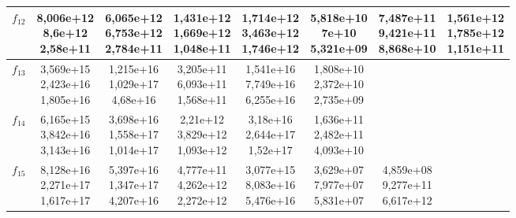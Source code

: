 \begin{table}[t]
\begin{small}
\begin{tabular}{|c|c|c|c|c|c|c|c|}
        $f_{12}$ & \makecell{8,006e+12 \\ 8,6e+12 \\ 2,58e+11}    & \makecell{6,065e+12 \\ 6,753e+12 \\ 2,784e+11} & \makecell{1,431e+12 \\ 1,669e+12 \\ 1,048e+11} & \makecell{1,714e+12 \\ 3,463e+12 \\ 1,746e+12} & \makecell{\textbf{5,818e+10} \\ \textbf{7e+10} \\ 5,321e+09}     & \makecell{7,487e+11 \\ 9,421e+11 \\ 8,868e+10} & \makecell{1,561e+12 \\ 1,785e+12 \\ 1,151e+11}  \\\hline
        $f_{13}$ & \makecell{3,569e+15 \\ 2,423e+16 \\ 1,805e+16} & \makecell{1,215e+16 \\ 1,029e+17 \\ 4,68e+16}  & \makecell{3,205e+11 \\ 6,093e+11 \\ 1,568e+11} & \makecell{1,541e+16 \\ 7,749e+16 \\ 6,255e+16} & \makecell{1,808e+10 \\ 2,372e+10 \\ 2,735e+09} & & \\\hline
        $f_{14}$ & \makecell{6,165e+15 \\ 3,842e+16 \\ 3,143e+16} & \makecell{3,698e+16 \\ 1,558e+17 \\ 1,014e+17} & \makecell{2,21e+12 \\ 3,829e+12 \\ 1,093e+12}  & \makecell{3,18e+16 \\ 2,644e+17 \\ 1,52e+17}  & \makecell{1,636e+11 \\ 2,482e+11 \\ 4,093e+10} & & \\\hline
        $f_{15}$ & \makecell{8,128e+16 \\ 2,271e+17 \\ 1,617e+17} & \makecell{5,397e+16 \\ 1,347e+17 \\ 4,207e+16} & \makecell{4,777e+11 \\ 4,262e+12 \\ 2,272e+12} & \makecell{3,077e+15 \\ 8,083e+16 \\ 5,476e+16} & \makecell{3,629e+07 \\ 7,977e+07 \\ 5,831e+07} & \makecell{4,859e+08 \\ 9,277e+11 \\ 6,617e+12} & \\\hline

\end{tabular}
\end{small}
\end{table}
